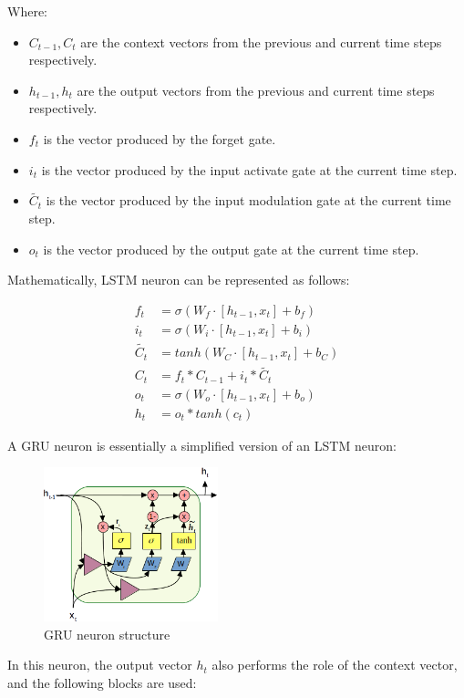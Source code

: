 \documentclass[sn-apa]{sn-jnl}%
\begin{document}
Where:
\begin{itemize}
\item $C_{t-1},C_t$ are the context vectors from the  previous and current time steps respectively.
\item $h_{t-1}, h_t$ are the output vectors from the previous and current time steps respectively.
\item $f_t$ is the vector produced by the forget gate.
\item $i_t$ is the vector produced by the input activate gate at the current time step.
\item $\tilde{C_t}$ is the vector produced by the input modulation gate at the current time step.
\item $o_t$ is the vector produced by the output gate at the current time step.
\end{itemize}

Mathematically, LSTM neuron can be represented as follows:

\begin{align}
f_t &= \sigma( W_f \cdot [h_{t-1},x_t] + b_f) \nonumber \\
i_t &= \sigma( W_i \cdot [h_{t-1},x_t] + b_i) \nonumber \\
\tilde{C_t} &= tanh( W_C \cdot [h_{t-1},x_t] + b_C) \nonumber \\
C_t &= f_t * C_{t-1} + i_t * \tilde{C_t} \nonumber \\
o_t &= \sigma( W_o \cdot [h_{t-1},x_t] + b_o) \nonumber \\
h_t &= o_t * tanh(c_t) \label{eq6}
\end{align}

A GRU neuron is essentially a simplified version of an LSTM neuron: 
\begin{figure}[H]
\centering
\includegraphics[width=0.45\textwidth]{gru_neuron_structure.png}
\caption{GRU neuron structure}\label{fig2}
\end{figure}

In this neuron, the output vector $h_t$ also performs the role of the context vector, and the following blocks are used:
\end{document}
